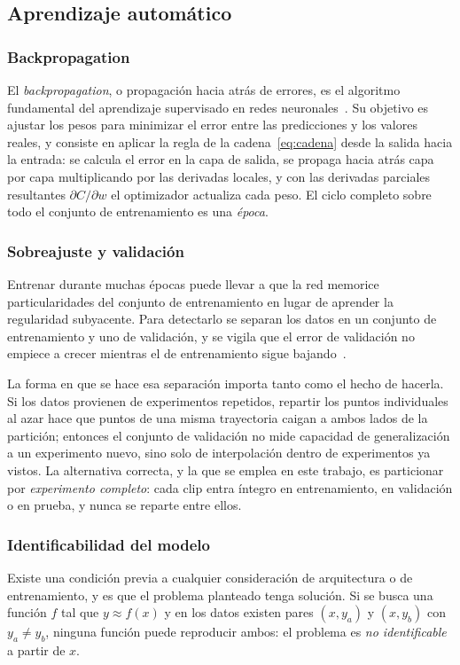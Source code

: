 \documentclass[titlepage,11pt]{article}
\begin{document}
\subsection{Aprendizaje automático}
\label{subsec:ML}

\subsubsection{Backpropagation}
El \emph{backpropagation}, o propagación hacia atrás de errores, es el
algoritmo fundamental del aprendizaje supervisado en redes
neuronales~\cite{rumelhart_1986_backprop,goodfellow_2016_deep}. Su
objetivo es ajustar los pesos para minimizar el error entre las predicciones y
los valores reales, y consiste en aplicar la regla de la
cadena~\eqref{eq:cadena} desde la salida hacia la entrada: se calcula el error
en la capa de salida, se propaga hacia atrás capa por capa multiplicando por
las derivadas locales, y con las derivadas parciales resultantes
$\partial C/\partial w$ el optimizador actualiza cada peso. El ciclo completo
sobre todo el conjunto de entrenamiento es una \emph{época}.

\subsubsection{Sobreajuste y validación}
\label{subsubsec:sobreajuste}
Entrenar durante muchas épocas puede llevar a que la red memorice
particularidades del conjunto de entrenamiento en lugar de aprender la
regularidad subyacente. Para detectarlo se separan los datos en un conjunto de
entrenamiento y uno de validación, y se vigila que el error de validación no
empiece a crecer mientras el de entrenamiento sigue
bajando~\cite{goodfellow_2016_deep,hastie_2009_elements}.

La forma en que se hace esa separación importa tanto como el hecho de hacerla.
Si los datos provienen de experimentos repetidos, repartir los puntos
individuales al azar hace que puntos de una misma trayectoria caigan a ambos
lados de la partición; entonces el conjunto de validación no mide capacidad de
generalización a un experimento nuevo, sino solo de interpolación dentro de
experimentos ya vistos. La alternativa correcta, y la que se emplea en este
trabajo, es particionar por \emph{experimento completo}: cada clip entra
íntegro en entrenamiento, en validación o en prueba, y nunca se reparte entre
ellos.

\subsubsection{Identificabilidad del modelo}
\label{subsubsec:identificabilidad}
Existe una condición previa a cualquier consideración de arquitectura o de
entrenamiento, y es que el problema planteado tenga solución. Si se busca una
función $f$ tal que $y\approx f(x)$ y en los datos existen pares $(x,y_a)$ y
$(x,y_b)$ con $y_a\neq y_b$, ninguna función puede reproducir ambos: el
problema es \emph{no identificable} a partir de $x$.
\end{document}

